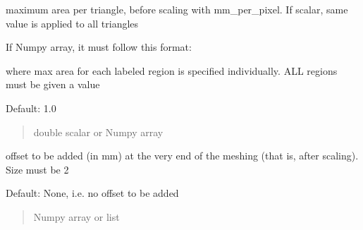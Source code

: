 \documentclass[letterpaper,10pt,english]{sphinxmanual}
\begin{document}
\begin{fulllineitems}
\begin{fulllineitems}
\label{\detokenize{_autosummary/nirfasterff.utils.MeshingParams2D:nirfasterff.utils.MeshingParams2D.max_area}}
\pysigstartsignatures
{}
\pysigstopsignatures
\sphinxAtStartPar
maximum area per triangle, before scaling with mm\_per\_pixel. If scalar, same value is applied to all triangles

\sphinxAtStartPar
If Numpy array, it must follow this format:

\begin{sphinxVerbatim}[commandchars=\\\{\}]
\PYG{p}{[} \PYG{p}{]}
\PYG{p}{[} \PYG{p}{]}
\end{sphinxVerbatim}

\sphinxAtStartPar
where max area for each labeled region is specified individually. ALL regions must be given a value

\sphinxAtStartPar
Default: 1.0
\begin{quote}\begin{description}
\sphinxAtStartPar
double scalar or Numpy array

\end{description}\end{quote}

\end{fulllineitems}


\begin{fulllineitems}
\label{\detokenize{_autosummary/nirfasterff.utils.MeshingParams2D:nirfasterff.utils.MeshingParams2D.offset}}
\pysigstartsignatures
{}
\pysigstopsignatures
\sphinxAtStartPar
offset to be added (in mm) at the very end of the meshing (that is, after scaling). Size must be 2

\sphinxAtStartPar
Default: None, i.e. no offset to be added
\begin{quote}\begin{description}
\sphinxAtStartPar
Numpy array or list

\end{description}\end{quote}


\end{fulllineitems}
\end{fulllineitems}
\end{document}

